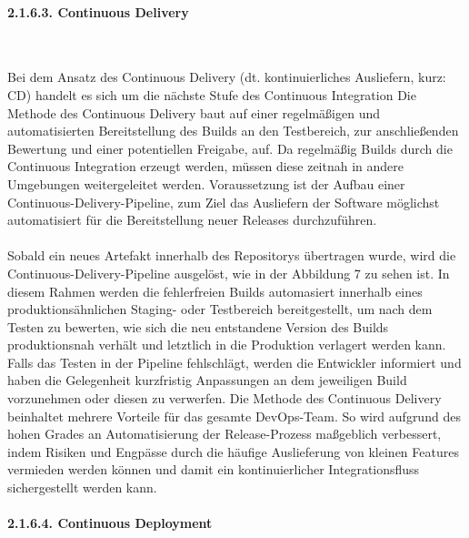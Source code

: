 \paragraph{2.1.6.3. Continuous Delivery} $~$

Bei dem Ansatz des Continuous Delivery (dt. kontinuierliches Ausliefern, kurz: CD) handelt es sich um die nächste Stufe des Continuous Integration Die Methode des Continuous Delivery baut auf einer regelmäßigen und automatisierten Bereitstellung des Builds an den Testbereich, zur anschließenden Bewertung und einer potentiellen Freigabe, auf. \cite[S. 16 - 18]{sharma_devops_2017} Da regelmäßig Builds durch die Continuous Integration erzeugt werden, müssen diese zeitnah in andere Umgebungen weitergeleitet werden. \cite[S. 16 - 18]{sharma_devops_2017} Voraussetzung ist der Aufbau einer Continuous-Delivery-Pipeline, zum Ziel das Ausliefern der Software möglichst automatisiert für die Bereitstellung neuer Releases durchzuführen. \cite[S. 10]{wolff_continuous_2016} \\\\ Sobald ein neues Artefakt innerhalb des Repositorys übertragen wurde, wird die Continuous-Delivery-Pipeline ausgelöst, wie in der Abbildung 7 zu sehen ist. \cite[S. 14]{verona_practical_2016} In diesem Rahmen werden die fehlerfreien Builds automasiert innerhalb eines produktionsähnlichen Staging- oder Testbereich bereitgestellt, um nach dem Testen zu bewerten, wie sich die neu entstandene Version des Builds produktionsnah verhält und letztlich in die Produktion verlagert werden kann. \cite[S. 16]{sharma_devops_2017}\cite{thedev_eight_2019} Falls das Testen in der Pipeline fehlschlägt, werden die Entwickler informiert und haben die Gelegenheit kurzfristig Anpassungen an dem jeweiligen Build vorzunehmen oder diesen zu verwerfen. Die Methode des Continuous Delivery beinhaltet mehrere Vorteile für das gesamte DevOps-Team. So wird aufgrund des hohen Grades an Automatisierung der Release-Prozess maßgeblich verbessert, indem Risiken und Engpässe durch die häufige Auslieferung von kleinen Features vermieden werden können und damit ein kontinuierlicher Integrationsfluss sichergestellt werden kann. \cite[S. 18]{wolff_continuous_2016}

\paragraph{2.1.6.4. Continuous Deployment} $~$


